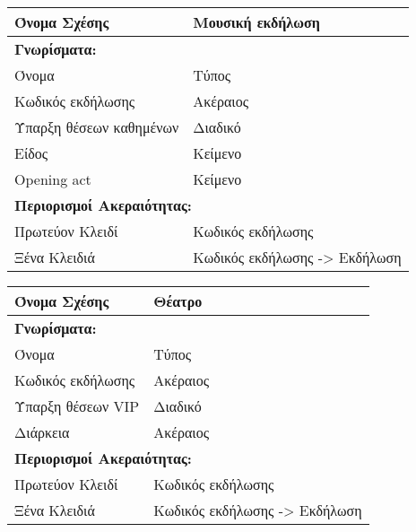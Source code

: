\begin{tabular}{|p{6cm}|p{8cm}|}
  \hline
  Όνομα Σχέσης            & Μουσική εκδήλωση               \\ \hline
  \multicolumn{2}{|l|}{\textbf{Γνωρίσματα:}}               \\ \hline
  Όνομα                   & Τύπος                          \\ \hline
  Κωδικός εκδήλωσης       & Ακέραιος                       \\ \hline
  Ύπαρξη θέσεων καθημένων & Διαδικό                        \\ \hline
  Είδος                   & Κείμενο                        \\ \hline
  Opening act             & Κείμενο                        \\ \hline
  \multicolumn{2}{|l|}{\textbf{Περιορισμοί Ακεραιότητας:}} \\ \hline
  Πρωτεύον Κλειδί         & Κωδικός εκδήλωσης              \\ \hline
  Ξένα Κλειδιά            & Κωδικός εκδήλωσης -> Εκδήλωση  \\ \hline
\end{tabular}

\begin{tabular}{|p{6cm}|p{8cm}|}
  \hline
  Όνομα Σχέσης      & Θέατρο                               \\ \hline
  \multicolumn{2}{|l|}{\textbf{Γνωρίσματα:}}               \\ \hline
  Όνομα             & Τύπος                                \\ \hline
  Κωδικός εκδήλωσης & Ακέραιος                             \\ \hline
  Ύπαρξη θέσεων VIP & Διαδικό                              \\ \hline
  Διάρκεια          & Ακέραιος                             \\ \hline
  \multicolumn{2}{|l|}{\textbf{Περιορισμοί Ακεραιότητας:}} \\ \hline
  Πρωτεύον Κλειδί   & Κωδικός εκδήλωσης                    \\ \hline
  Ξένα Κλειδιά      & Κωδικός εκδήλωσης -> Εκδήλωση        \\ \hline
\end{tabular}

